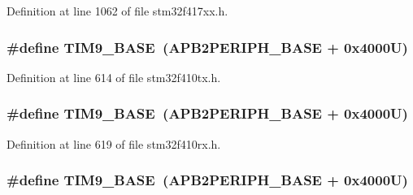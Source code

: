 Definition at line 1062 of file stm32f417xx.\+h.

\subsubsection[{\texorpdfstring{T\+I\+M9\+\_\+\+B\+A\+SE}{TIM9_BASE}}]{\setlength{\rightskip}{0pt plus 5cm}\#define T\+I\+M9\+\_\+\+B\+A\+SE~({\bf A\+P\+B2\+P\+E\+R\+I\+P\+H\+\_\+\+B\+A\+SE} + 0x4000\+U)}\hypertarget{group___peripheral__registers__structures_ga92ae902be7902560939223dd765ece08}{}\label{group___peripheral__registers__structures_ga92ae902be7902560939223dd765ece08}


Definition at line 614 of file stm32f410tx.\+h.

\subsubsection[{\texorpdfstring{T\+I\+M9\+\_\+\+B\+A\+SE}{TIM9_BASE}}]{\setlength{\rightskip}{0pt plus 5cm}\#define T\+I\+M9\+\_\+\+B\+A\+SE~({\bf A\+P\+B2\+P\+E\+R\+I\+P\+H\+\_\+\+B\+A\+SE} + 0x4000\+U)}\hypertarget{group___peripheral__registers__structures_ga92ae902be7902560939223dd765ece08}{}\label{group___peripheral__registers__structures_ga92ae902be7902560939223dd765ece08}


Definition at line 619 of file stm32f410rx.\+h.

\subsubsection[{\texorpdfstring{T\+I\+M9\+\_\+\+B\+A\+SE}{TIM9_BASE}}]{\setlength{\rightskip}{0pt plus 5cm}\#define T\+I\+M9\+\_\+\+B\+A\+SE~({\bf A\+P\+B2\+P\+E\+R\+I\+P\+H\+\_\+\+B\+A\+SE} + 0x4000\+U)}\hypertarget{group___peripheral__registers__structures_ga92ae902be7902560939223dd765ece08}{}\label{group___peripheral__registers__structures_ga92ae902be7902560939223dd765ece08}


